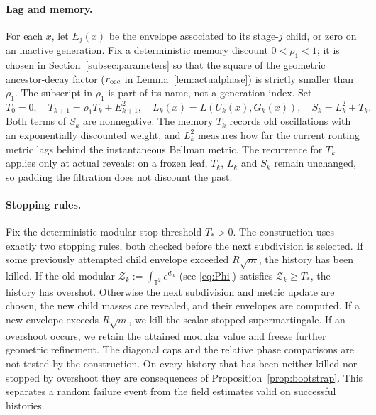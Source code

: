 \documentclass[11pt]{article}
\theoremstyle{definition}
\theoremstyle{remark}
\numberwithin{equation}{section}
\newcommand{\T}{\mathbb T}
\begin{document}
\paragraph{Lag and memory.}
For each $x$, let $E_j(x)$ be the envelope associated to its stage-$j$
child, or zero on an inactive generation. Fix a deterministic memory
discount $0<\rho_1<1$; it is chosen in
Section~\ref{subsec:parameters} so that the square of the geometric
ancestor-decay factor ($r_{\rm osc}$ in Lemma~\ref{lem:actualphase})
is strictly smaller than $\rho_1$. The subscript in $\rho_1$ is part
of its name, not a generation index. Set
\begin{equation}\label{eq:memory}
 T_0=0,\quad T_{k+1}=\rho_1T_k+E_{k+1}^2,\quad
 L_k(x)=L(U_k(x),G_k(x)),\quad S_k=L_k^2+T_k.
\end{equation}
Both terms of $S_k$ are nonnegative. The memory $T_k$ records old
oscillations with an exponentially discounted weight, and $L_k^2$
measures how far the current routing metric lags behind the
instantaneous Bellman metric. The recurrence for $T_k$ applies only
at actual reveals: on a frozen leaf, $T_k$, $L_k$ and $S_k$ remain
unchanged, so padding the filtration does not discount the past.

\paragraph{Stopping rules.}
Fix the deterministic modular stop threshold $T_*>0$. The construction
uses exactly two stopping rules, both checked before the next
subdivision is selected. If some previously attempted child envelope
exceeded $R\sqrt m$, the history has been killed. If the old modular
\label{not:modularfirst}
$\mathcal Z_k:=\int_{\T^2}e^{\Phi_k}$ (see \eqref{eq:Phi}) satisfies
$\mathcal Z_k\ge T_*$, the history has overshot. Otherwise the next
subdivision and metric update are chosen, the new child masses are
revealed, and their envelopes are computed. If a new envelope
exceeds $R\sqrt m$, we kill the scalar stopped supermartingale. If an overshoot
occurs, we retain the attained modular value and freeze further
geometric refinement. The diagonal caps and the relative phase
comparisons are not tested by the construction. On every
history that has been neither killed nor stopped by overshoot they
are consequences of Proposition~\ref{prop:bootstrap}. This separates
a random failure event from the field estimates valid on successful
histories.
\end{document}

